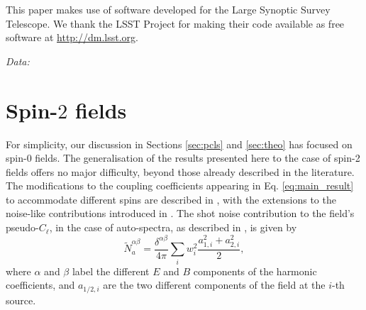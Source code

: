 \documentclass[aps,twocolumn, superscriptaddress, english, nofootinbib, 10pt]{revtex4-2}
\begin{document}
This paper makes use of software developed for the Large Synoptic Survey Telescope. We thank the LSST Project for making their code available as free software at \url{http://dm.lsst.org}. 

\emph{Data:} 

\onecolumngrid
\newpage

\appendix
\section{Spin-$2$ fields}\label{app:spin_s}
  For simplicity, our discussion in Sections \ref{sec:pcls} and \ref{sec:theo} has focused on spin-0 fields. The generalisation of the results presented here to the case of spin-2 fields offers no major difficulty, beyond those already described in the literature. The modifications to the coupling coefficients appearing in Eq. \ref{eq:main_result} to accommodate different spins are described in \cite{1906.11765}, with the extensions to the noise-like contributions introduced in \cite{2010.09717}. The shot noise contribution to the field's pseudo-$C_\ell$, in the case of auto-spectra, as described in \cite{2407.21013}, is given by
  \begin{equation}
    \tilde{N}^{\alpha\beta}_a=\frac{\delta^{\alpha\beta}}{4\pi}\sum_iw_i^2\frac{a_{1,i}^2+a_{2,i}^2}{2},
  \end{equation}
  where $\alpha$ and $\beta$ label the different $E$ and $B$ components of the harmonic coefficients, and $a_{1/2,i}$ are the two different components of the field at the $i$-th source.
\end{document}
